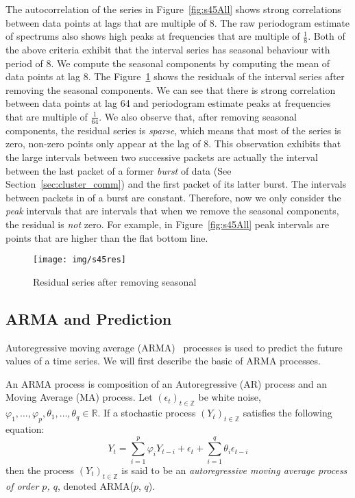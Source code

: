 \documentclass[12pt]{article}
\begin{document}
The autocorrelation of the series in Figure~\ref{fig:s45All} shows strong
correlations between data points at lags that are multiple of 8. The raw
periodogram estimate of spectrums also shows high peaks at frequencies that are
multiple of $\frac{1}{8}$. Both of the above criteria exhibit that the interval
series has seasonal behaviour with period of 8. We compute the seasonal
components by computing the mean of data points at lag 8. The
Figure~\ref{fig:s45res} shows the residuals of the interval series after
removing the seasonal components. We can see that there is strong correlation
between data points at lag 64 and periodogram estimate peaks at frequencies
that are multiple of $\frac{1}{64}$. We also observe that, after removing
seasonal components, the residual series is \textit{sparse}, which means that
most of the series is zero, non-zero points only appear at the lag of 8. This
observation exhibits that the large intervals between two successive packets are
actually the interval between the last packet of a former \textit{burst} of data
(See Section~\ref{sec:cluster_comm}) and the first packet of its latter burst.
The intervals between packets in of a burst are constant. Therefore, now we only
consider the \textit{peak} intervals that are intervals that when we remove
the seasonal components, the residual is \textit{not} zero. For example, in
Figure~\ref{fig:s45All} peak intervals are points that are higher than the flat
bottom line.

\begin{figure}[ht!]
\centering
\texttt{[image: img/s45res]}
\caption{Residual series after removing seasonal}\label{fig:s45res}
\end{figure}



\subsection{ARMA and Prediction}
Autoregressive moving average (ARMA)~\cite{BoxTimeSeries, FalkStatSAS}
 processes is used to predict the future values of a time series. We will first
 describe the basic of ARMA processes.
 
 An ARMA process is composition of an Autoregressive (AR) process and an Moving
 Average (MA) process. Let $(\epsilon_t)_{t\in \mathbb{Z}}$ be white noise,
 $\varphi_1, \ldots, \varphi_p, \theta_1, \ldots, \theta_q\in\mathbb{R}$. If a
stochastic process $(Y_t)_{t\in \mathbb{Z}}$ satisfies the following
 equation:
 \begin{equation}\label{eqn:ARMA}
 Y_t=\sum_{i=1}^{p}\varphi_iY_{t-i}+
 \epsilon_t +\sum_{i=1}^{q}\theta_i\epsilon_{t-i}
 \end{equation}
then the process $(Y_t)_{t\in \mathbb{Z}}$ is said to be
an \textit{autoregressive moving average process of order $p$, $q$}, denoted
ARMA($p$, $q$).
\end{document}
